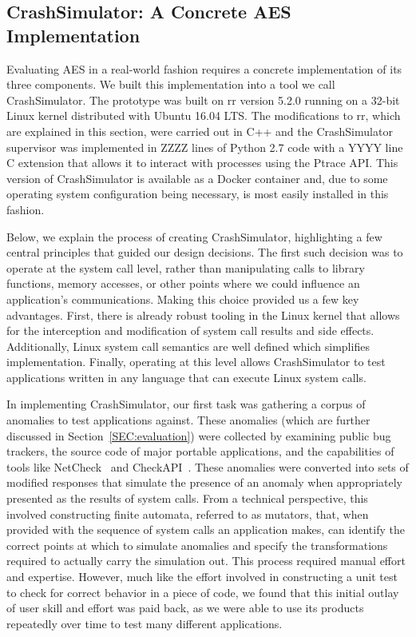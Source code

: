 \subsection{CrashSimulator: A Concrete AES Implementation}
\label{SUBSEC:ApproachCrashSim}
Evaluating AES in a real-world fashion requires a
concrete implementation of its three components.
We built this implementation into a tool we call CrashSimulator.  The
prototype was built on rr version 5.2.0 running on a 32-bit Linux kernel
distributed with Ubuntu 16.04 LTS.  The modifications to rr, which are
explained in this section, were carried out in C++ and the CrashSimulator
supervisor was implemented in ZZZZ lines of Python 2.7 code with a YYYY
line C extension that allows it to interact with processes using the Ptrace
API.
This version of CrashSimulator is available as a Docker container and,
due to some operating system configuration being necessary, is most easily
installed in this fashion.

Below, we explain the process of creating CrashSimulator, highlighting a
few central principles that guided our design decisions. The first such
decision was to operate at the system call level, rather than manipulating
calls to library functions, memory accesses, or other points where we could
influence an application's communications. Making this choice provided us a
few key advantages. First, there is already robust tooling in the Linux
kernel that allows for the interception and modification of system call
results and side effects. Additionally, Linux system call semantics are
well defined which simplifies implementation. Finally, operating at this
level allows CrashSimulator to test applications written in any language
that can execute Linux system calls.

In implementing CrashSimulator, our first task was
gathering a corpus of anomalies to test applications
against.  These anomalies (which are further discussed
in Section~\ref{SEC:evaluation})
were collected by examining public bug trackers,
the source code of major portable applications, and the capabilities of
tools like NetCheck~\cite{Zhuang_NSDI_2014}
and CheckAPI~\cite{rasley2015detecting}.  These anomalies were converted
into sets of modified responses
that simulate the presence of an anomaly when
appropriately presented as the results of system calls.
From a technical perspective, this involved constructing finite automata,
referred to as mutators, that, when provided with the sequence of system
calls an application makes, can identify the correct points at which to
simulate anomalies and specify the transformations required to actually
carry the simulation out.
This process required manual effort and expertise.
However,
much like
the effort involved in constructing a unit test to check for correct
behavior in a piece of code, we found that this initial outlay of
user skill and effort was paid back, as
we were able to use its products
repeatedly over time to test many different applications.

